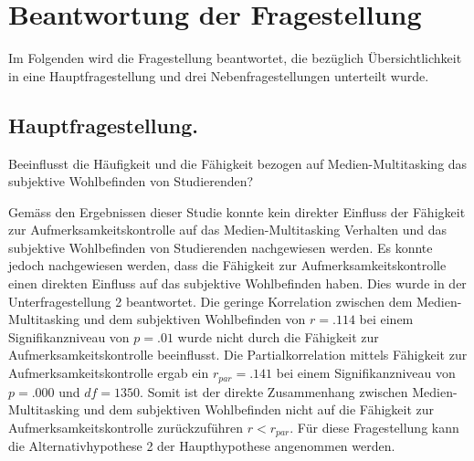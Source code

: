 %
%
\glsresetall
\let\raggedsection\centering
{}
\setcounter{chapter}{4}
\setcounter{section}{0}
\let\raggedsection\raggedright 

\section{Beantwortung der Fragestellung}\label{section.diskussion.fragestellung}
Im Folgenden wird die Fragestellung beantwortet, die bezüglich Übersichtlichkeit in eine Hauptfragestellung und drei Nebenfragestellungen unterteilt wurde. 
\par
\subsection{Hauptfragestellung.} Beeinflusst die Häufigkeit und die Fähigkeit bezogen auf Medien-Multitasking das subjektive Wohlbefinden von Studierenden?
\par
Gemäss den Ergebnissen dieser Studie konnte kein direkter Einfluss der Fähigkeit zur Aufmerksamkeitskontrolle auf das Medien-Multitasking Verhalten und das subjektive Wohlbefinden von Studierenden nachgewiesen werden. Es konnte jedoch nachgewiesen werden, dass die Fähigkeit zur Aufmerksamkeitskontrolle einen direkten Einfluss auf das subjektive Wohlbefinden haben. Dies wurde in der Unterfragestellung 2 beantwortet. Die geringe Korrelation zwischen dem Medien-Multitasking und dem subjektiven Wohlbefinden von $r=.114$ bei einem Signifikanzniveau von $p=.01$ wurde nicht durch die Fähigkeit zur Aufmerksamkeitskontrolle beeinflusst. Die Partialkorrelation mittels Fähigkeit zur Aufmerksamkeitskontrolle ergab ein $r_{par}=.141$ bei einem Signifikanzniveau von $p=.000$ und $df=1350$. Somit ist der direkte Zusammenhang zwischen Medien-Multitasking und dem subjektiven Wohlbefinden nicht auf die Fähigkeit zur Aufmerksamkeitskontrolle zurückzuführen $r<r_{par}$. Für diese Fragestellung kann die Alternativhypothese 2 der Haupthypothese angenommen werden.

